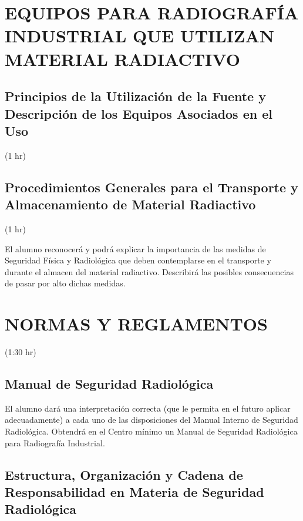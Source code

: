 \section{EQUIPOS PARA RADIOGRAFÍA INDUSTRIAL QUE UTILIZAN MATERIAL RADIACTIVO}

\subsection{Principios de la Utilización de la Fuente y Descripción de los Equipos Asociados en el Uso}
(1 hr)

\subsection{Procedimientos Generales para el Transporte y Almacenamiento de Material Radiactivo}
(1 hr)

El alumno reconocerá y podrá explicar la importancia de las medidas de Seguridad Física y Radiológica que deben contemplarse en el transporte y durante el almacen del material radiactivo. Describirá las posibles consecuencias de pasar por alto dichas medidas.

\section{NORMAS Y REGLAMENTOS}
(1:30 hr)

\subsection{Manual de Seguridad Radiológica}

El alumno dará una interpretación correcta (que le permita en el futuro aplicar adecuadamente) a cada uno de las disposiciones del Manual Interno de Seguridad Radiológica. Obtendrá en el Centro mínimo un Manual de Seguridad Radiológica para Radiografía Industrial.

\subsection{Estructura, Organización y Cadena de Responsabilidad en Materia de Seguridad Radiológica}

